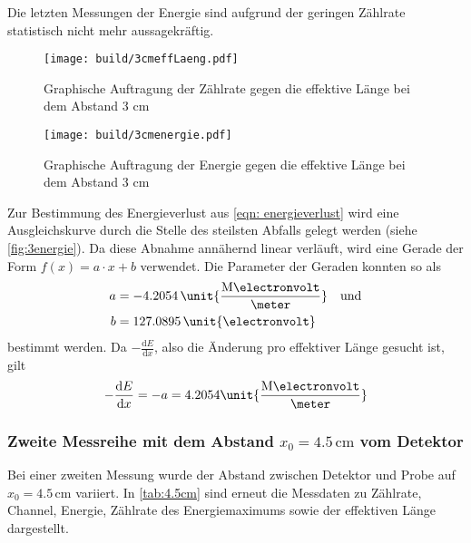 Die letzten Messungen der Energie sind aufgrund der geringen Zählrate statistisch nicht mehr aussagekräftig.
\begin{figure}
  \centering
  \texttt{[image: build/3cmeffLaeng.pdf]}
  \caption{Graphische Auftragung der Zählrate gegen die effektive Länge bei dem Abstand 3 $\unit{\cm}$}
  \label{fig:3graph}
\end{figure}
\begin{figure}
  \centering
  \texttt{[image: build/3cmenergie.pdf]}
  \caption{Graphische Auftragung der Energie gegen die effektive Länge bei dem Abstand 3 $\unit{\cm}$}
  \label{fig:3energie}
\end{figure}
Zur Bestimmung des Energieverlust aus \autoref{eqn: energieverlust} wird eine Ausgleichskurve durch die Stelle des steilsten Abfalls gelegt werden (siehe \autoref{fig:3energie}).
Da diese Abnahme annähernd linear verläuft, wird eine Gerade der Form $f(x)=a\cdot x+b$ verwendet.
Die Parameter der Geraden konnten so als
\begin{align*}
  a&=-4.2054\,  \unit{\frac{\text{M}\electronvolt}{\meter}} \quad \text{und}\\
  b&= 127.0895\, \unit{\electronvolt}
\end{align*}
bestimmt werden.
Da $-\frac{\text{d}E}{\text{d}x}$, also die Änderung pro effektiver Länge gesucht ist, gilt
\begin{equation*}
  -\frac{\text{d}E}{\text{d}x}=-a=4.2054  \unit{\frac{\text{M}\electronvolt}{\meter}}
\end{equation*}


\subsubsection{Zweite Messreihe mit dem Abstand $x_0= 4.5\, \unit{\cm}$ vom Detektor}
Bei einer zweiten Messung wurde der Abstand zwischen Detektor und Probe auf $x_0 = 4.5 \,\unit{\cm}$ variiert. In \autoref{tab:4.5cm} sind erneut die 
Messdaten zu Zählrate, Channel, Energie, Zählrate des Energiemaximums sowie der effektiven Länge dargestellt.

